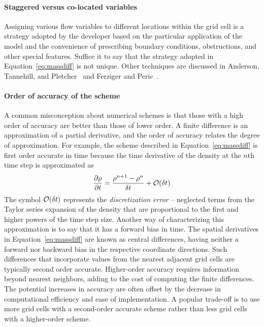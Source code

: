\documentclass[graybox]{svmult}
\begin{document}
\paragraph{Staggered versus co-located variables}

Assigning various flow variables to different locations within the grid cell is a strategy adopted by the developer based on the particular application of the model and the convenience of prescribing boundary conditions, obstructions, and other special features. Suffice it to say that the strategy adopted in Equation~\ref{eq:massdiff} is not unique. Other techniques are discussed in Anderson, Tannehill, and Pletcher~\cite{Anderson} and Ferziger and Peric~\cite{Ferziger}.

\paragraph{Order of accuracy of the scheme}

A common misconception about numerical schemes is that those with a high order of accuracy are better than those of lower order. A finite difference is an approximation of a partial derivative, and the order of accuracy relates the degree of approximation. For example, the scheme described in Equation~\ref{eq:massdiff} is first order accurate in time because the time derivative of the density at the $n$th time step is approximated as
\begin{equation}
\frac{\partial \rho}{\partial t} = \frac{\rho^{n+1}-\rho^n}{\delta t} + {\cal O}(\delta t)
\label{eq:order}
\end{equation}
The symbol ${\cal O}(\delta t)$ represents the {\em discretization error} -- neglected terms from the Taylor series expansion of the density that are proportional to the first and higher powers of the time step size. Another way of characterizing this approximation is to say that it has a forward bias in time. The spatial derivatives in Equation~\ref{eq:massdiff} are known as central differences, having neither a  forward nor backward bias in the respective coordinate directions. Such differences that incorporate values from the nearest adjacent grid cells are typically second order accurate. Higher-order accuracy requires information beyond nearest neighbors, adding to the cost of computing the finite differences. The potential increases in accuracy are often offset by the decrease in computational efficiency and ease of implementation. A popular trade-off is to use more grid cells with a second-order accurate scheme rather than less grid cells with a higher-order scheme.
\end{document}
